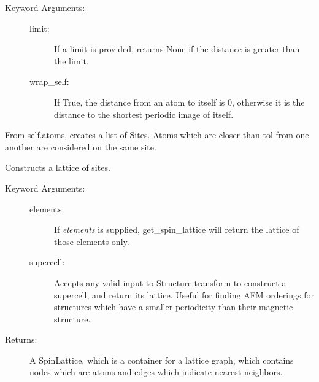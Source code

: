 \documentclass[letterpaper,10pt,english]{sphinxmanual}
\begin{document}
\begin{fulllineitems}
\begin{fulllineitems}
\begin{description}
\item[{Keyword Arguments:}] \leavevmode\begin{description}
\item[{limit: }] \leavevmode
If a limit is provided, returns None if the distance is
greater than the limit.

\item[{wrap\_self: }] \leavevmode
If True, the distance from an atom to itself is 0, otherwise it
is the distance to the shortest periodic image of itself.

\end{description}

\end{description}

\end{fulllineitems}


\begin{fulllineitems}
\label{models:qmpy.Structure.get_sites}
From self.atoms, creates a list of Sites. Atoms which are closer
than tol from one another are considered on the same site.

\end{fulllineitems}


\begin{fulllineitems}
\label{models:qmpy.Structure.get_spin_lattice}
Constructs a lattice of sites.
\begin{description}
\item[{Keyword Arguments:}] \leavevmode\begin{description}
\item[{elements:}] \leavevmode
If \emph{elements} is supplied, get\_spin\_lattice will return the 
lattice of those elements only.

\item[{supercell:}] \leavevmode
Accepts any valid input to Structure.transform to construct a
supercell, and return its lattice. Useful for finding AFM
orderings for structures which have a smaller periodicity than
their magnetic structure.

\end{description}

\item[{Returns:}] \leavevmode
A SpinLattice, which is a container for a lattice graph, which
contains nodes which are atoms and edges which indicate nearest
neighbors.


\end{description}
\end{fulllineitems}
\end{fulllineitems}
\end{document}
